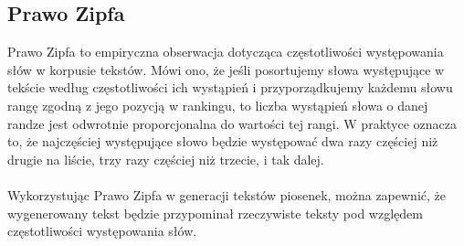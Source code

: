 \documentclass{article}
\begin{document}
\subsection{Prawo Zipfa}
Prawo Zipfa to empiryczna obserwacja dotycząca częstotliwości występowania słów w korpusie tekstów. Mówi ono, że jeśli posortujemy słowa występujące w tekście według częstotliwości ich wystąpień i przyporządkujemy każdemu słowu rangę zgodną z jego pozycją w rankingu, to liczba wystąpień słowa o danej randze jest odwrotnie proporcjonalna do wartości tej rangi. W praktyce oznacza to, że najczęściej występujące słowo będzie występować dwa razy częściej niż drugie na liście, trzy razy częściej niż trzecie, i tak dalej. \\
\\
Wykorzystując Prawo Zipfa w generacji tekstów piosenek, można zapewnić, że wygenerowany tekst będzie przypominał rzeczywiste teksty pod względem częstotliwości występowania słów.
\end{document}
